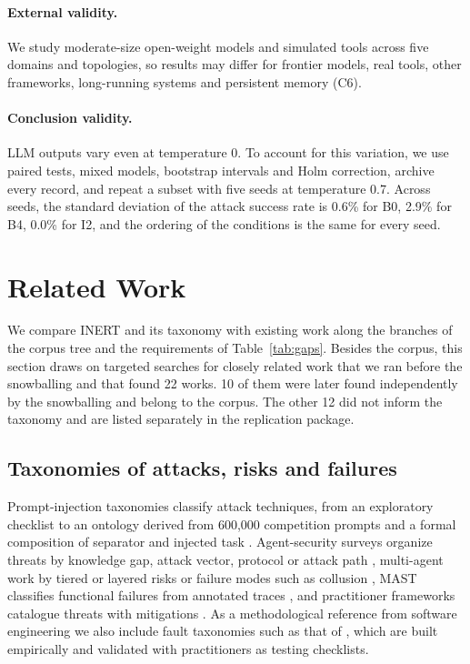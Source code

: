 \documentclass[pdflatex,sn-mathphys-num]{sn-jnl}
\theoremstyle{thmstyleone}%
\theoremstyle{thmstyletwo}%
\theoremstyle{thmstylethree}%
\newcommand{\NSupp}{12}
\newcommand{\NSuppSnow}{10}
\begin{document}
\paragraph{External validity.} We study moderate-size open-weight models and simulated tools across five domains and topologies, so results may differ for frontier models, real tools, other frameworks, long-running systems and persistent memory (C6).

\paragraph{Conclusion validity.} LLM outputs vary even at temperature 0. To account for this variation, we use paired tests, mixed models, bootstrap intervals and Holm correction, archive every record, and repeat a subset with five seeds at temperature 0.7.
Across seeds, the standard deviation of the attack success rate is 0.6\% for B0, 2.9\% for B4, 0.0\% for I2, and the ordering of the conditions is the same for every seed.

\section{Related Work}\label{sec:related}

We compare INERT and its taxonomy with existing work along the branches of the corpus tree and the requirements of Table~\ref{tab:gaps}. Besides the corpus, this section draws on targeted searches for closely related work that we ran before the snowballing and that found 22 works. \NSuppSnow{} of them were later found independently by the snowballing and belong to the corpus. The other \NSupp{} did not inform the taxonomy and are listed separately in the replication package.

\subsection{Taxonomies of attacks, risks and failures}\label{sec:rw-tax}

Prompt-injection taxonomies classify attack techniques, from an exploratory checklist \citep{rossi2024categorization} to an ontology derived from 600,000 competition prompts \citep{schulhoff2023hackaprompt} and a formal composition of separator and injected task \citep{liu2024formalizing}. Agent-security surveys organize threats by knowledge gap, attack vector, protocol or attack path \citep{deng2025agentsthreat,Ferrag2025FromPIB,Wang2026TheLOT,Yang2026SoKWSJ}, multi-agent work by tiered or layered risks \citep{Mitra2026WhereREC,Wang2026TrinityGuardAUF} or failure modes such as collusion \citep{hammond2025multiagent}, MAST classifies functional failures from annotated traces \citep{cemri2025mast}, and practitioner frameworks catalogue threats with mitigations \citep{owasp2025agentic,mitre2025atlas}. As a methodological reference from software engineering we also include fault taxonomies such as that of \citet{humbatova2020taxonomy}, which are built empirically and validated with practitioners as testing checklists.
\end{document}
